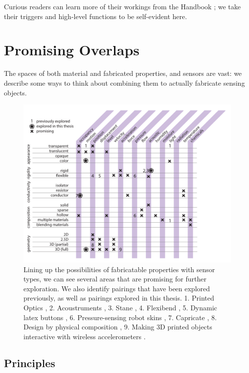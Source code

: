 Curious readers can learn more of their workings from the Handbook \cite{fraden-modernsensors}; we take their triggers and high-level functions to be self-evident here.

\section{Promising Overlaps}

The spaces of both material and fabricated properties, and sensors are vast: we describe some ways to think about combining them to actually fabricate sensing objects.

\begin{figure}
\centering
\includegraphics[width=6in]{figures/sensing-fab.pdf}
\caption{Lining up the possibilities of fabricatable properties with sensor types, we can see several areas that are promising for further exploration. We also identify pairings that have been explored previously, as well as pairings explored in this thesis. 1. Printed Optics \cite{willis-printedoptics}, 2. Acoustruments \cite{laput-acoustruments}, 3. Stane \cite{murray-smith-stane}, 4. Flexibend \cite{chien-flexibend}, 5. Dynamic latex buttons \cite{harrison-buttons}, 6. Pressure-sensing robot skins \cite{slyper-pressure}, 7. Capricate \cite{schmitz-capricate}, 8. Design by physical composition \cite{doering-composition}, 9. Making 3D printed objects interactive with wireless accelerometers \cite{hook-making}.}
\label{fig:sensing-fab}
\end{figure}

\subsection{Principles}
    
